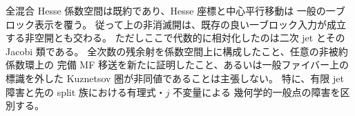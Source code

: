 \begin{remark}[一般性と依存範囲]
全混合 Hesse 係数空間は既約であり、Hesse 座標と中心平行移動は
一般の一ブロック表示を覆う。
従って上の非消滅開は、既存の良い一ブロック入力が成立する非空開とも交わる。
ただしここで代数的に相対化したのは二次 jet とその Jacobi 類である。
全次数の残余射を係数空間上に構成したこと、任意の非被約係数環上の
完備 MF 移送を新たに証明したこと、あるいは一般ファイバー上の
標識を外した Kuznetsov 圏が非同値であることは主張しない。
特に、有限 jet 障害と先の split 族における有理式・$j$ 不変量による
幾何学的一般点の障害を区別する。
\end{remark}
